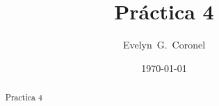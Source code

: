 



\title{Práctica 4}
\author{Evelyn~G.~Coronel}


\date[]{\lowercase{\today}} %

\begin{abstract}
Practica 4
\end{abstract} 
\maketitle
%



